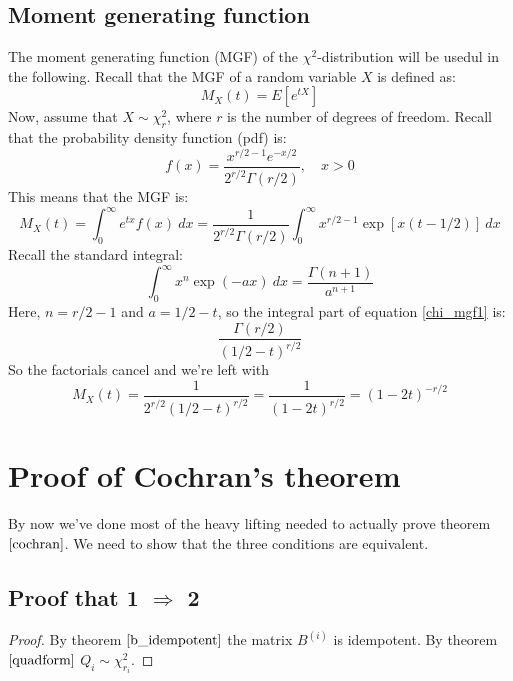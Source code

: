 \documentclass[12pt, a4paper]{article}
\begin{document}
\subsection{Moment generating function}
The moment generating function (MGF) of the $\chi^2$-distribution will be usedul in the following. Recall that the MGF of a random variable $X$ is defined as:
\begin{equation}
M_X(t)=E\left[e^{tX}\right]
\end{equation}
Now, assume that $X\sim\chi^2_r$, where $r$ is the number of degrees of freedom. Recall that the probability density function (pdf) is:
\begin{equation}
f(x)=\frac{x^{r/2-1}e^{-x/2}}{2^{r/2}\Gamma(r/2)},\quad x>0
\end{equation}
This means that the MGF is:
\begin{equation}
\label{chi_mgf1}
M_X(t)=\int_0^\infty e^{tx}f(x)\ dx=\frac{1}{2^{r/2}\Gamma(r/2)}\int_0^\infty x^{r/2-1}\exp\left[x(t-1/2)\right]\ dx
\end{equation}
Recall the standard integral:
\begin{equation}
\int_0^\infty x^n\exp(-ax)\ dx=\frac{\Gamma(n+1)}{a^{n+1}}
\end{equation}
Here, $n=r/2-1$ and $a=1/2-t$, so the integral part of equation \ref{chi_mgf1} is:
\begin{equation}
\frac{\Gamma(r/2)}{(1/2-t)^{r/2}}
\end{equation}
So the factorials cancel and we're left with
\begin{equation}
M_X(t)=\frac{1}{2^{r/2}(1/2-t)^{r/2}}=\frac{1}{(1-2t)^{r/2}}=(1-2t)^{-r/2}
\end{equation}

\section{Proof of Cochran's theorem}
By now we've done most of the heavy lifting needed to actually prove theorem $\ref{cochran}$. We need to show that the three conditions are equivalent.

\subsection{Proof that 1 $\Rightarrow$ 2}
\begin{proof}
By theorem $\ref{b_idempotent}$ the matrix $B^{(i)}$ is idempotent. By theorem $\ref{quadform}$ $Q_i\sim\chi^2_{r_i}$.
\end{proof}
\end{document}
